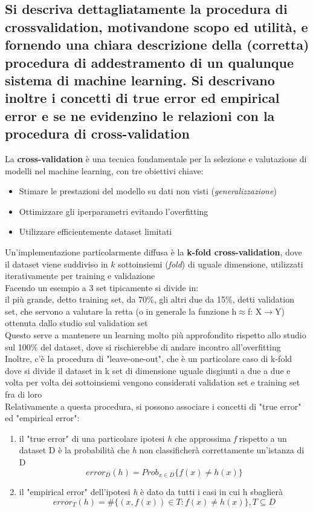 \documentclass[10pt,oneside,a4paper]{article}
\begin{document}
	\subsection{Si descriva dettagliatamente la procedura di crossvalidation, motivandone scopo ed utilità,
		e fornendo una chiara descrizione della (corretta) procedura di addestramento di un
		qualunque sistema di machine learning. Si descrivano inoltre i concetti di true error ed
		empirical error e se ne evidenzino le relazioni con la procedura di cross-validation}
	La \textbf{cross-validation} è una tecnica fondamentale per la selezione e valutazione di modelli nel machine learning, con tre obiettivi chiave:
	\begin{itemize}
		\item Stimare le prestazioni del modello su dati non visti (\textit{generalizzazione})
		\item Ottimizzare gli iperparametri evitando l'overfitting
		\item Utilizzare efficientemente dataset limitati
	\end{itemize}
	Un'implementazione particolarmente diffusa è la \textbf{k-fold cross-validation}, dove il dataset viene suddiviso in $k$ sottoinsiemi (\textit{fold}) di uguale dimensione, utilizzati iterativamente per training e validazione\\
	Facendo un esempio a 3 set tipicamente si divide in:\\
	il più grande, detto training set, da 70\%, gli altri due da 15\%, detti validation set, che servono a valutare la retta (o in generale la funzione h$\approx$f: X$\to$Y) ottenuta dallo studio sul validation set\\
	Questo serve a mantenere un learning molto più approfondito rispetto allo studio sul 100\% del dataset, dove si rischierebbe di andare incontro all'overfitting\\
	Inoltre, c'è la procedura di "leave-one-out", che è un particolare caso di k-fold dove si divide il dataset in k set di dimensione uguale disgiunti a due a due e volta per volta dei sottoinsiemi vengono considerati validation set e training set fra di loro\\
	Relativamente a questa procedura, si possono associare i concetti di "true error" ed "empirical error":\\
	\begin{enumerate}
		\item il "true error" di una particolare ipotesi \textit{h} che approssima \textit{f} rispetto a un dataset D è la probabilità che
			  \textit{h} non classificherà correttamente un'istanza di D\\
			  \[ error_D(h) = Prob_{x \in D}\{ f(x) \neq h(x) \} \]
		\item il "empirical error" dell'ipotesi \textit{h} è dato da tutti i casi in cui h sbaglierà\\
			  \[ error_T(h) = \#\{ (x,f(x)) \in T : f(x) \neq h(x) \}, T \subseteq D \]
	\end{enumerate}
\end{document}
